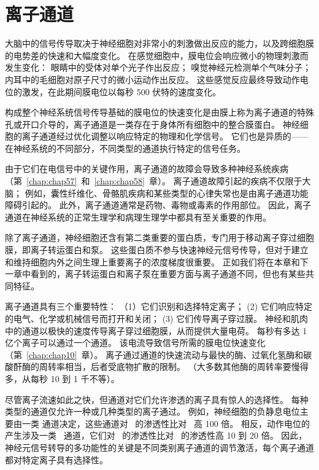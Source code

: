 \chapter{离子通道} \label{chap:chap8}

大脑中的信号传导取决于神经细胞对非常小的刺激做出反应的能力，以及跨细胞膜的电势差的快速和大幅度变化。 
在感觉细胞中，膜电位会响应微小的物理刺激而发生变化：
眼睛中的受体对单个光子作出反应；
嗅觉神经元检测单个气味分子；
内耳中的毛细胞对原子尺寸的微小运动作出反应。
这些感觉反应最终导致动作电位的激发，在此期间膜电位以每秒 500 伏特的速度变化。


构成整个神经系统信号传导基础的膜电位的快速变化是由膜上称为离子通道的特殊孔或开口介导的，离子通道是一类存在于身体所有细胞中的整合膜蛋白。
神经细胞的离子通道经过优化调整以响应特定的物理和化学信号。
它们也是异质的——在神经系统的不同部分，不同类型的通道执行特定的信号任务。


由于它们在电信号中的关键作用，离子通道的故障会导致多种神经系统疾病（第~\ref{chap:chap57}~和~\ref{chap:chap58}~章）。
离子通道故障引起的疾病不仅限于大脑；
例如，囊性纤维化、骨骼肌疾病和某些类型的心律失常也是由离子通道功能障碍引起的。
此外，离子通道通常是药物、毒物或毒素的作用部位。
因此，离子通道在神经系统的正常生理学和病理生理学中都具有至关重要的作用。


除了离子通道，神经细胞还含有第二类重要的蛋白质，专门用于移动离子穿过细胞膜，即离子转运蛋白和泵。
这些蛋白质不参与快速神经元信号传导，但对于建立和维持细胞内外之间生理上重要离子的浓度梯度很重要。
正如我们将在本章和下一章中看到的，离子转运蛋白和离子泵在重要方面与离子通道不同，但也有某些共同特征。


离子通道具有三个重要特性：
（1）它们识别和选择特定离子；
(2) 它们响应特定的电气、化学或机械信号而打开和关闭；
(3) 它们传导离子穿过膜。
神经和肌肉中的通道以极快的速度传导离子穿过细胞膜，从而提供大量电荷。
每秒有多达 1 亿个离子可以通过一个通道。
该电流导致信号所需的膜电位快速变化（第~\ref{chap:chap10}~章）。
离子通过通道的快速流动与最快的酶、过氧化氢酶和碳酸酐酶的周转率相当，后者受底物扩散的限制。
（大多数其他酶的周转率要慢得多，从每秒 10 到 1 千不等）。


尽管离子流速如此之快，但通道对它们允许渗透的离子具有惊人的选择性。
每种类型的通道仅允许一种或几种类型的离子通过。
例如，神经细胞的负静息电位主要由一类  通道决定，这些通道对~ 的渗透性比对~ 高 100 倍。
相反，动作电位的产生涉及一类~ 通道，它们对~ 的渗透性比对~ 的渗透性高 10 到 20 倍。
因此，神经元信号转导的多功能性的关键是不同类别离子通道的调节激活，每个离子通道都对特定离子具有选择性。


